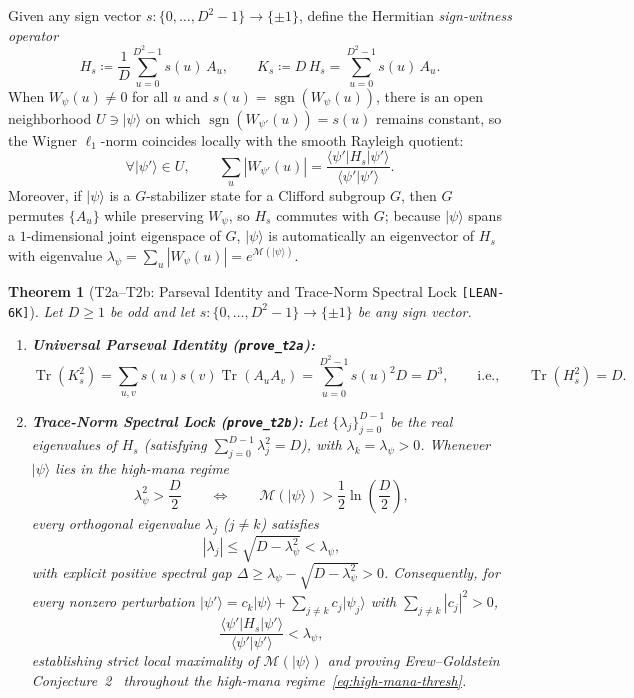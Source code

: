 \documentclass[11pt,letterpaper]{article}
\theoremstyle{plain}
\newtheorem{theorem}{Theorem}[section]
\theoremstyle{definition}
\theoremstyle{remark}
\newcommand{\Tr}{\operatorname{Tr}}
\newcommand{\Mana}{\mathcal{M}}
\newcommand{\ket}[1]{\lvert #1 \rangle}
\newcommand{\bra}[1]{\langle #1 \rvert}
\newcommand{\braket}[2]{\langle #1 \vert #2 \rangle}
\newcommand{\leanref}[1]{\textnormal{\texttt{\footnotesize #1}}}
\newcommand{\tagbadge}[1]{\textnormal{\texttt{\small [#1]}}}
\begin{document}
Given any sign vector $s:\{0,\dots,D^2-1\}\to\{\pm 1\}$, define the Hermitian \emph{sign-witness operator}
\begin{equation}
\label{eq:sign-witness}
  H_s \coloneqq \frac{1}{D}\sum_{u=0}^{D^2-1} s(u)\,A_u,
  \qquad K_s \coloneqq D\,H_s = \sum_{u=0}^{D^2-1} s(u)\,A_u.
\end{equation}
When $W_\psi(u)\neq 0$ for all $u$ and $s(u)=\operatorname{sgn}(W_\psi(u))$, there is an open neighborhood $U\ni\ket{\psi}$ on which $\operatorname{sgn}(W_{\psi'}(u))=s(u)$ remains constant, so the Wigner $\ell_1$-norm coincides locally with the smooth Rayleigh quotient:
\[
  \forall \ket{\psi'}\in U, \qquad \sum_u |W_{\psi'}(u)| = \frac{\bra{\psi'}H_s\ket{\psi'}}{\braket{\psi'}{\psi'}}.
\]
Moreover, if $\ket{\psi}$ is a $G$-stabilizer state for a Clifford subgroup $G$, then $G$ permutes $\{A_u\}$ while preserving $W_\psi$, so $H_s$ commutes with $G$; because $\ket{\psi}$ spans a $1$-dimensional joint eigenspace of $G$, $\ket{\psi}$ is automatically an eigenvector of $H_s$ with eigenvalue $\lambda_\psi=\sum_u|W_\psi(u)|=e^{\Mana(\ket{\psi})}$.

\begin{theorem}[{T2a--T2b: Parseval Identity and Trace-Norm Spectral Lock \tagbadge{LEAN-6K}}]
\label{thm:t2ab}
Let $D\ge 1$ be odd and let $s:\{0,\dots,D^2-1\}\to\{\pm 1\}$ be any sign vector.
\begin{enumerate}[leftmargin=2em,itemsep=2pt]
  \item \textbf{Universal Parseval Identity (\leanref{prove\_t2a}):}
  \[
    \Tr(K_s^2) = \sum_{u,v} s(u)s(v)\Tr(A_u A_v) = \sum_{u=0}^{D^2-1} s(u)^2 D = D^3,
    \qquad\text{i.e.,}\qquad \Tr(H_s^2) = D.
  \]
  \item \textbf{Trace-Norm Spectral Lock (\leanref{prove\_t2b}):} Let $\{\lambda_j\}_{j=0}^{D-1}$ be the real eigenvalues of $H_s$ (satisfying $\sum_{j=0}^{D-1}\lambda_j^2 = D$), with $\lambda_k = \lambda_\psi > 0$. Whenever $\ket{\psi}$ lies in the \emph{high-mana regime}
  \begin{equation}
  \label{eq:high-mana-thresh}
    \lambda_\psi^2 > \frac{D}{2}
    \qquad\Longleftrightarrow\qquad
    \Mana(\ket{\psi}) > \frac{1}{2}\ln\!\left(\frac{D}{2}\right),
  \end{equation}
  every orthogonal eigenvalue $\lambda_j$ ($j\neq k$) satisfies
  \[
    |\lambda_j| \le \sqrt{D - \lambda_\psi^2} < \lambda_\psi,
  \]
  with explicit positive spectral gap $\Delta \ge \lambda_\psi - \sqrt{D-\lambda_\psi^2} > 0$. Consequently, for every nonzero perturbation $\ket{\psi'}=c_k\ket{\psi}+\sum_{j\neq k} c_j\ket{\psi_j}$ with $\sum_{j\neq k}|c_j|^2>0$,
  \[
    \frac{\bra{\psi'}H_s\ket{\psi'}}{\braket{\psi'}{\psi'}} < \lambda_\psi,
  \]
  establishing strict local maximality of $\Mana(\ket{\psi})$ and proving Erew--Goldstein Conjecture~2~\cite{ErewGoldstein2026} throughout the high-mana regime~\eqref{eq:high-mana-thresh}.
\end{enumerate}
\end{theorem}
\end{document}
